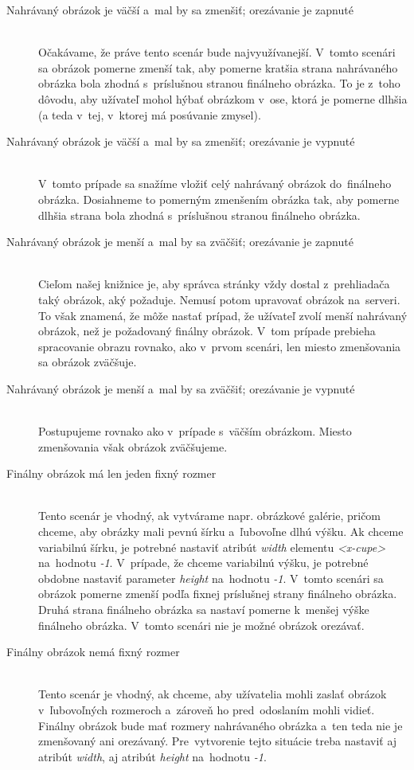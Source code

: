 \begin{description}
	\item[Nahrávaný obrázok je väčší a~mal by sa zmenšiť; orezávanie je zapnuté] \hfill \\
	Očakávame, že práve tento scenár bude najvyužívanejší. V~tomto scenári sa obrázok pomerne zmenší tak, aby pomerne kratšia strana nahrávaného obrázka bola zhodná s~príslušnou stranou finálneho obrázka. To je z~toho dôvodu, aby užívateľ mohol hýbať obrázkom v~ose, ktorá je pomerne dlhšia (a teda v~tej, v~ktorej má posúvanie zmysel).
	\item[Nahrávaný obrázok je väčší a~mal by sa zmenšiť; orezávanie je vypnuté] \hfill \\
	V~tomto prípade sa snažíme vložiť celý nahrávaný obrázok do~finálneho obrázka. Dosiahneme to pomerným zmenšením obrázka tak, aby pomerne dlhšia strana bola zhodná s~príslušnou stranou finálneho obrázka.
	\item[Nahrávaný obrázok je menší a~mal by sa zväčšiť; orezávanie je zapnuté] \hfill \\
	Cieľom našej knižnice je, aby správca stránky vždy dostal z~prehliadača taký obrázok, aký požaduje. Nemusí potom upravovať obrázok na~serveri. To však znamená, že môže nastať prípad, že užívateľ zvolí menší nahrávaný obrázok, než je požadovaný finálny obrázok. V~tom prípade prebieha spracovanie obrazu rovnako, ako v~prvom scenári, len miesto zmenšovania sa obrázok zväčšuje.
	\item[Nahrávaný obrázok je menší a~mal by sa zväčšiť; orezávanie je vypnuté] \hfill \\
	Postupujeme rovnako ako v~prípade s~väčším obrázkom. Miesto zmenšovania však obrázok zväčšujeme.
	\item[Finálny obrázok má len jeden fixný rozmer] \hfill \\
	Tento scenár je vhodný, ak vytvárame napr. obrázkové galérie, pričom chceme, aby obrázky mali pevnú šírku a~ľubovoľne dlhú výšku. Ak chceme variabilnú šírku, je potrebné nastaviť atribút \emph{width} elementu \emph{<x-cupe>} na~hodnotu \emph{-1}. V~prípade, že chceme variabilnú výšku, je potrebné obdobne nastaviť parameter \emph{height} na~hodnotu \emph{-1}. V~tomto scenári sa obrázok pomerne zmenší podľa fixnej príslušnej strany finálneho obrázka. Druhá strana finálneho obrázka sa nastaví pomerne k~menšej výške finálneho obrázka. V~tomto scenári nie je možné obrázok orezávať.
	\item[Finálny obrázok nemá fixný rozmer] \hfill \\
	Tento scenár je vhodný, ak chceme, aby užívatelia mohli zaslať obrázok v~ľubovoľných rozmeroch a~zároveň ho pred~odoslaním mohli vidieť. Finálny obrázok bude mať rozmery nahrávaného obrázka a~ten teda nie je zmenšovaný ani orezávaný. Pre~vytvorenie tejto situácie treba nastaviť aj atribút \emph{width}, aj atribút \emph{height} na~hodnotu \emph{-1}.
	
\end{description}


